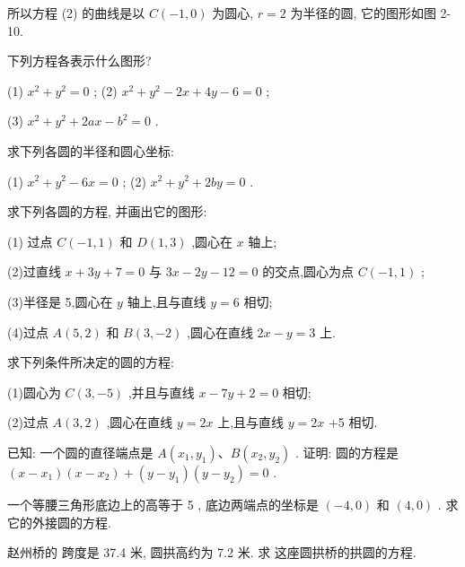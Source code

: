 \documentclass[lang=cn,newtx,12pt,scheme=chinese]{elegantbook}
\begin{document}
所以方程 (2) 的曲线是以 \(C\left( {-1,0}\right)\) 为圆心, \(r = 2\) 为半径的圆, 它的图形如图 2-10.

\begin{problemset}[练习]

\item 下列方程各表示什么图形?

(1) \({x}^{2} + {y}^{2} = 0\) ; (2) \({x}^{2} + {y}^{2} - {2x} + {4y} - 6 = 0\) ;

(3) \({x}^{2} + {y}^{2} + {2ax} - {b}^{2} = 0\) .

\item 求下列各圆的半径和圆心坐标:

(1) \({x}^{2} + {y}^{2} - {6x} = 0\) ; (2) \({x}^{2} + {y}^{2} + {2by} = 0\) .
\end{problemset}

\begin{problemset}[习 题 五]

\item 求下列各圆的方程, 并画出它的图形:

(1) 过点 \(C\left( {-1,1}\right)\) 和 \(D\left( {1,3}\right)\) ,圆心在 \(x\) 轴上;

(2)过直线 \(x + {3y} + 7 = 0\) 与 \({3x} - {2y} - {12} = 0\) 的交点,圆心为点 \(C\left( {-1,1}\right)\) ;

(3)半径是 5,圆心在 \(y\) 轴上,且与直线 \(y = 6\) 相切;

(4)过点 \(A\left( {5,2}\right)\) 和 \(B\left( {3, - 2}\right)\) ,圆心在直线 \({2x} - y = 3\) 上.

\item 求下列条件所决定的圆的方程:

(1)圆心为 \(C\left( {3, - 5}\right)\) ,并且与直线 \(x - {7y} + 2 = 0\) 相切;

(2)过点 \(A\left( {3,2}\right)\) ,圆心在直线 \(y = {2x}\) 上,且与直线 \(y = {2x}\) +5 相切.

\item 已知: 一个圆的直径端点是 \(A\left( {{x}_{1},{y}_{1}}\right) \text{、}B\left( {{x}_{2},{y}_{2}}\right)\) . 证明: 圆的方程是 \(\left( {x - {x}_{1}}\right) \left( {x - {x}_{2}}\right) + \left( {y - {y}_{1}}\right) \left( {y - {y}_{2}}\right) = 0\) .

\item 一个等腰三角形底边上的高等于 5 , 底边两端点的坐标是 \(\left( {-4,0}\right)\) 和 \(\left( {4,0}\right)\) . 求它的外接圆的方程.

\item 赵州桥的 跨度是 37.4 米, 圆拱高约为 7.2 米. 求 这座圆拱桥的拱圆的方程.


\end{problemset}
\end{document}
